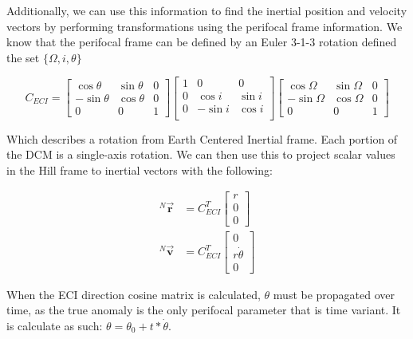 \documentclass[paper]{aiaaNew}
\begin{document}
Additionally, we can use this information to find the inertial position and velocity vectors by performing transformations using the perifocal frame information. We know that the perifocal frame can be defined by an Euler 3-1-3 rotation defined the set $\{\Omega, i, \theta \}$

\begin{equation}
C_{ECI} = 
\begin{bmatrix}
\cos{\theta} & \sin{\theta} & 0 \\
-\sin{\theta} & \cos{\theta} & 0 \\
0 & 0 & 1 
\end{bmatrix}
\begin{bmatrix}
1 & 0 & 0 \\
0 & \cos{i} & \sin{i} \\
0 & -\sin{i} & \cos{i} \\
\end{bmatrix}
\begin{bmatrix}
\cos{\Omega} & \sin{\Omega} & 0 \\
-\sin{\Omega} & \cos{\Omega} & 0 \\
0 & 0 & 1 
\end{bmatrix}
\end{equation}

Which describes a rotation from Earth Centered Inertial frame. Each portion of the DCM is a single-axis rotation. We can then use this to project scalar values in the Hill frame to inertial vectors with the following:

\begin{align}
  ^N\vec{\bm{r}} &= C_{ECI}^T 
  \begin{bmatrix}
  r \\ 0 \\ 0
  \end{bmatrix} \\
  ^N\vec{\bm{v}} &= C_{ECI}^T
  \begin{bmatrix}
  0 \\ r\dot{\theta} \\ 0
  \end{bmatrix}
\end{align}

When the ECI direction cosine matrix is calculated, $\theta$ must be propagated over time, as the true anomaly is the only perifocal parameter that is time variant. It is calculate as such: $\theta = \theta_0 + t*\dot{\theta}$.
\end{document}
